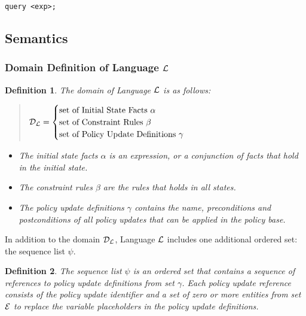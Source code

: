 \documentclass[10pt, twocolumn]{article}
\newtheorem{definition}{Definition}
\begin{document}
        \begin{verbatim}query <exp>;\end{verbatim} 

    \subsection{Semantics}

      \subsubsection{Domain Definition of Language ${\cal L}$}

        \begin{definition}
          The domain of Language ${\cal L}$ is as follows:

          \begin{quote}
            \begin{math}
              {\cal D}_{\cal L} = 
              \begin{cases}
                \mbox{set of Initial State Facts $\alpha$} \\
                \mbox{set of Constraint Rules $\beta$} \\
                \mbox{set of Policy Update Definitions $\gamma$}
              \end{cases}
            \end{math}
          \end{quote}

          \begin{itemize}
            \item
              The initial state facts $\alpha$ is an expression, or a
              conjunction of facts that hold in the initial state.
            \item
              The constraint rules $\beta$ are the rules that holds in all
              states.
            \item
              The policy update definitions $\gamma$ contains the name,
              preconditions and postconditions of all policy updates that
              can be applied in the policy base.
          \end{itemize}
        \end{definition}

        In addition to the domain ${\cal D}_{\cal L}$, Language ${\cal L}$
        includes one additional ordered set: the sequence list $\psi$.

        \begin{definition}
          The sequence list $\psi$ is an ordered set that contains a sequence 
          of references to policy update definitions from set $\gamma$. Each
          policy update reference consists of the policy update identifier and
          a set of zero or more entities from set ${\cal E}$ to replace the
          variable placeholders in the policy update definitions.
        \end{definition}
\end{document}
